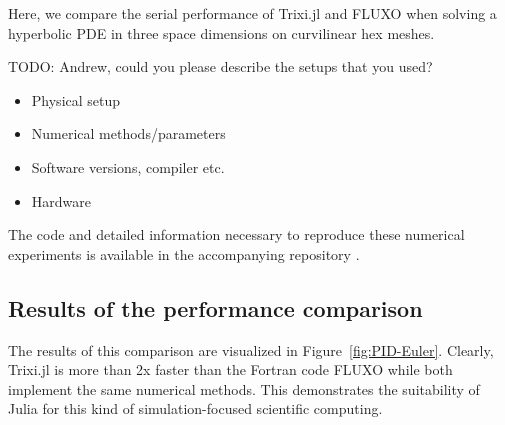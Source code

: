 \documentclass{juliacon}
\makeatletter
\newcommand{\etc}[0]{{etc.\@}\xspace}
\newcommand{\trixi}{Trixi.jl\xspace}
\newcommand{\todo}[1]{{\color{red}#1}}
\makeatother
\begin{document}
Here, we compare the serial performance of \trixi and FLUXO when solving a
hyperbolic PDE in three space dimensions on curvilinear hex meshes.

\todo{TODO: Andrew, could you please describe the setups that you used? %
\begin{itemize}
  \item Physical setup
  \item Numerical methods/parameters
  \item Software versions, compiler \etc
  \item Hardware
\end{itemize}}

The code and detailed information necessary to reproduce these numerical
experiments is available in the accompanying repository \cite{ranocha2021adaptiveRepro}.

\subsection{Results of the performance comparison}

The results of this comparison are visualized in Figure~\ref{fig:PID-Euler}.
Clearly, \trixi is more than 2x faster than the Fortran code FLUXO
while both implement the same numerical methods. This demonstrates the
suitability of Julia for this kind of simulation-focused scientific computing.
\end{document}

